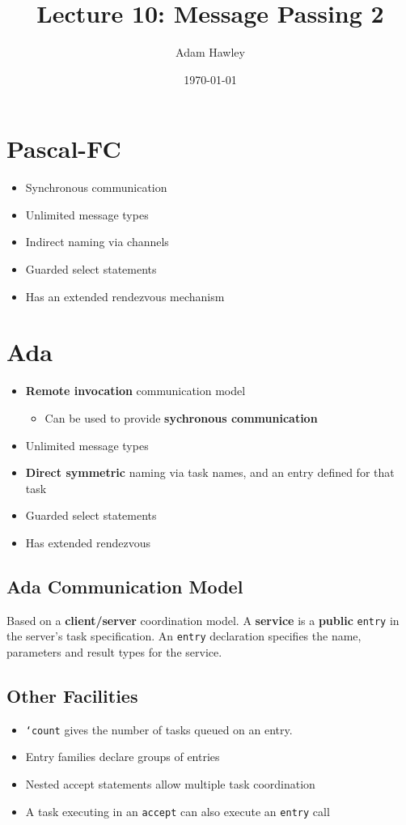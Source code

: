 \documentclass[11pt]{article}
\author{Adam Hawley}
\date{\today}
\title{Lecture 10: Message Passing 2}
\begin{document}
\maketitle
\tableofcontents


\section{Pascal-FC}
\label{sec:org4d6c208}
\begin{itemize}
\item Synchronous communication
\item Unlimited message types
\item Indirect naming via channels
\item Guarded select statements
\item Has an extended rendezvous mechanism
\end{itemize}

\section{Ada}
\label{sec:orgc95c3c3}
\begin{itemize}
\item \textbf{Remote invocation} communication model
\begin{itemize}
\item Can be used to provide \textbf{sychronous communication}
\end{itemize}
\item Unlimited message types
\item \textbf{Direct symmetric} naming via task names, and an entry defined for that task
\item Guarded select statements
\item Has extended rendezvous
\end{itemize}

\subsection{Ada Communication Model}
\label{sec:org9cc16bd}
Based on a \textbf{client/server} coordination model.
A \textbf{service} is a \textbf{public} \texttt{entry} in the server's task specification.
An \texttt{entry} declaration specifies the name, parameters and result types for the service.

\subsection{Other Facilities}
\label{sec:org2a9da9f}
\begin{itemize}
\item \texttt{`count} gives the number of tasks queued on an entry.
\item Entry families declare groups of entries
\item Nested accept statements allow multiple task coordination
\item A task executing in an \texttt{accept} can also execute an \texttt{entry} call
\end{itemize}
\end{document}
